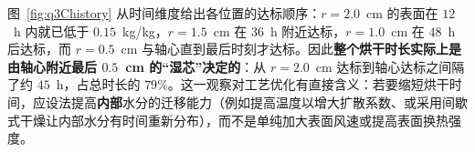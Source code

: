 图~\ref{fig:q3Chistory} 从时间维度给出各位置的达标顺序：$r=2.0$~cm 的表面在 $12$~h 内就已低于 $0.15$~kg/kg，$r=1.5$~cm 在 $36$~h 附近达标，$r=1.0$~cm 在 $48$~h 后达标，而 $r=0.5$~cm 与轴心直到最后时刻才达标。因此\textbf{整个烘干时长实际上是由轴心附近最后 $0.5$~cm 的``湿芯''决定的}：从 $r=2.0$~cm 达标到轴心达标之间隔了约 $45$~h，占总时长的 $79\%$。这一观察对工艺优化有直接含义：若要缩短烘干时间，应设法提高\textbf{内部}水分的迁移能力（例如提高温度以增大扩散系数、或采用间歇式干燥让内部水分有时间重新分布），而不是单纯加大表面风速或提高表面换热强度。
